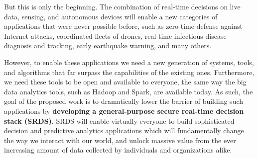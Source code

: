 \documentclass [10pt]{article}
\begin{document}
\begin{outline}
But this is only the beginning. The combination of real-time decisions on live data, sensing, and autonomous devices will enable a new categories of applications that were never possible before, such as zero-time defense against Internet attacks, coordinated fleets of drones, real-time infectious disease diagnosis and tracking, early earthquake warning, and many others.

However, to enable these applications we need a new generation of systems, tools, and algorithms that far surpass the capabilities of the existing ones.  Furthermore, we need these tools to be open and available to everyone, the same way the big data analytics tools, such as Hadoop and Spark, are available today.  As such, the goal of the proposed work is to dramatically lower the barrier of building such applications by {\bf developing a general-purpose secure real-time decision stack (SRDS)}. SRDS will enable virtually everyone to build sophisticated decision and predictive analytics applications which will fundamentally change the way we interact with our world, and unlock massive value from the ever increasing amount of data collected by individuals and organizations alike.






\end{outline}
\end{document}
